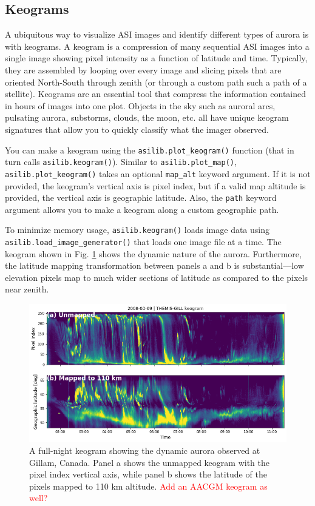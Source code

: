 \documentclass[draft]{agujournal2019}
\begin{document}
\subsection{Keograms}
A ubiquitous way to visualize ASI images and identify different types of aurora is with keograms. A keogram is a compression of many sequential ASI images into a single image showing pixel intensity as a function of latitude and time. Typically, they are assembled by looping over every image and slicing pixels that are oriented North-South through zenith (or through a custom path such a path of a stellite). Keograms are an essential tool that compress the information contained in hours of images into one plot. Objects in the sky such as auroral arcs, pulsating aurora, substorms, clouds, the moon, etc. all have unique keogram signatures that allow you to quickly classify what the imager observed. 

You can make a keogram using the \verb|asilib.plot_keogram()| function (that in turn calls \verb|asilib.keogram()|). Similar to \verb|asilib.plot_map()|, \verb|asilib.plot_keogram()| takes an optional \verb|map_alt| keyword argument. If it is not provided, the keogram's vertical axis is pixel index, but if a valid map altitude is provided, the vertical axis is geographic latitude. Also, the \verb|path| keyword argument allows you to make a keogram along a custom geographic path. 

To minimize memory usage, \verb|asilib.keogram()| loads image data using \verb|asilib.load_image_generator()| that loads one image file at a time. The keogram shown in Fig. \ref{fig3} shows the dynamic nature of the aurora. Furthermore, the latitude  mapping transformation between panels a and b is substantial---low elevation pixels map to much wider sections of latitude as compared to the pixels near zenith.

\begin{figure}
      \includegraphics[width=\textwidth]{figures/fig3.png}
      \caption{A full-night keogram showing the dynamic aurora observed at Gillam, Canada. Panel a shows the unmapped keogram with the pixel index vertical axis, while panel b shows the latitude of the pixels mapped to 110 km altitude. \textcolor{red}{Add an AACGM keogram as well?}}
      \label{fig3}
\end{figure}
\end{document}
